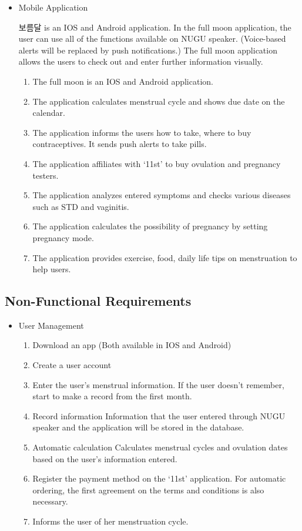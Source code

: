 \documentclass[conference]{IEEEtran}
\begin{document}
\begin{itemize}
\setlength{\parindent}{2ex}
\item Mobile Application

보름달 is an IOS and Android application. In the full moon application, the user can use all of the functions available on NUGU speaker. (Voice-based alerts will be replaced by push notifications.) The full moon application allows the users to check out and enter further information visually.
\begin{enumerate}
\item The full moon is an IOS and Android application.
\item The application calculates menstrual cycle and shows due date on the calendar. 
\item The application informs the users how to take, where to buy contraceptives. It sends push alerts to take pills.
\item The application affiliates with ‘11st’ to buy ovulation and pregnancy testers.
\item The application analyzes entered symptoms and checks various diseases such as STD and vaginitis.
\item The application calculates the possibility of pregnancy by setting pregnancy mode.
\item The application provides exercise, food, daily life tips on menstruation to help users.
\end{enumerate}
\end{itemize}


\subsection{Non-Functional Requirements}
\begin{itemize}
\item User Management
\begin{enumerate}
\item Download an app (Both available in IOS and Android)
\item Create a user account
\item Enter the user’s menstrual information.
If the user doesn’t remember, start to make a record from the first month.
\item Record information
Information that the user entered through NUGU speaker and the application will be stored in the database.
\item Automatic calculation
Calculates menstrual cycles and ovulation dates based on the user’s information entered.
\item Register the payment method on the ‘11st’ application.
For automatic ordering, the first agreement on the terms and conditions is also necessary.
\item Informs the user of her menstruation cycle.
\end{enumerate}
\end{itemize}
\end{document}
